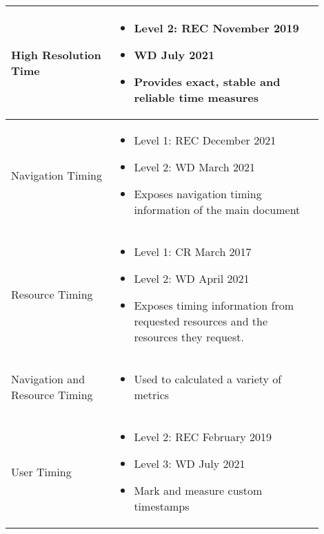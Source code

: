 

\begin{center}
\small
	\begin{tabular}{ p{0.3\linewidth} | p{0.6\linewidth} }
	High Resolution Time &
	\begin{itemize}[label={}, noitemsep,nolistsep, leftmargin=0cm]
		\item Level 2: REC November 2019
		\item WD July 2021
		\item Provides exact, stable and reliable time measures
	\end{itemize} \\
	\hline
	Navigation Timing &
	\begin{itemize}[label={}, noitemsep,nolistsep, leftmargin=0cm]
		\item Level 1: REC December 2021
		\item Level 2: WD March 2021
		\item Exposes navigation timing information of the main document
	\end{itemize} \\
	\hline
	Resource Timing &
	\begin{itemize}[label={}, noitemsep,nolistsep, leftmargin=0cm]
		\item Level 1: CR March 2017
		\item Level 2: WD April 2021
		\item Exposes timing information from requested resources and the resources they request. 
	\end{itemize} \\
	\hline
	Navigation and Resource Timing &
	\begin{itemize}[label={}, noitemsep,nolistsep, leftmargin=0cm]
		\item Used to calculated a variety of metrics
	\end{itemize} \\	
	\hline
	\hline
	User Timing & 
	\begin{itemize}[label={}, noitemsep,nolistsep, leftmargin=0cm]
		\item Level 2: REC February 2019
		\item Level 3: WD July 2021
		\item Mark and measure custom timestamps

\end{itemize}
\end{tabular}
\end{center}
